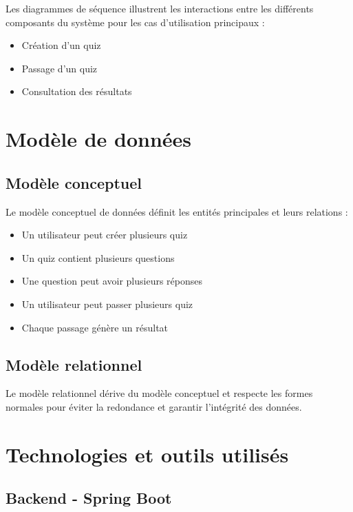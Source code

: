 \documentclass[12pt,a4paper]{report}
\begin{document}
Les diagrammes de séquence illustrent les interactions entre les différents composants du système pour les cas d'utilisation principaux :

\begin{itemize}
    \item Création d'un quiz
    \item Passage d'un quiz
    \item Consultation des résultats
\end{itemize}

\section{Modèle de données}

\subsection{Modèle conceptuel}

Le modèle conceptuel de données définit les entités principales et leurs relations :

\begin{itemize}
    \item Un utilisateur peut créer plusieurs quiz
    \item Un quiz contient plusieurs questions
    \item Une question peut avoir plusieurs réponses
    \item Un utilisateur peut passer plusieurs quiz
    \item Chaque passage génère un résultat
\end{itemize}

\subsection{Modèle relationnel}

Le modèle relationnel dérive du modèle conceptuel et respecte les formes normales pour éviter la redondance et garantir l'intégrité des données.

\section{Technologies et outils utilisés}

\subsection{Backend - Spring Boot}
\end{document}

